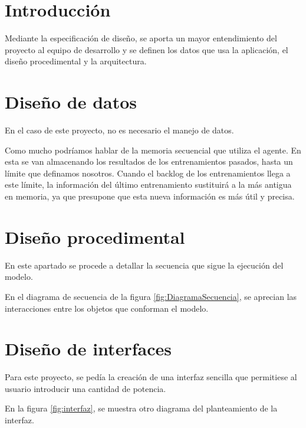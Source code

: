 
\section{Introducción}

Mediante la especificación de diseño, se aporta un mayor entendimiento del proyecto al equipo de desarrollo y se definen los datos que usa la aplicación, el diseño procedimental y la arquitectura.

\section{Diseño de datos}

En el caso de este proyecto, no es necesario el manejo de datos.

Como mucho podríamos hablar de la memoria secuencial que utiliza el agente. En esta se van almacenando los resultados de los entrenamientos pasados, hasta un límite que definamos nosotros.
Cuando el backlog de los entrenamientos llega a este límite, la información del último entrenamiento sustituirá a la más antigua en memoria, ya que presupone que esta nueva información es más útil y precisa.

\section{Diseño procedimental}

En este apartado se procede a detallar la secuencia que sigue la ejecución del modelo.

En el diagrama de secuencia de la figura \ref{fig:DiagramaSecuencia}, se aprecian las interacciones entre los objetos que conforman el modelo.

\label{fig:DiagramaSecuencia}

\section{Diseño de interfaces}

Para este proyecto, se pedía la creación de una interfaz sencilla que permitiese al usuario introducir una cantidad de potencia.

En la figura \ref{fig:interfaz}, se muestra otro diagrama del planteamiento de la interfaz.

\label{fig:interfaz}